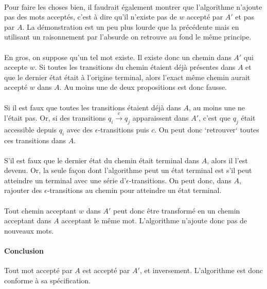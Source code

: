 \documentclass{article}[11pt]
\theoremstyle{definition}
\begin{document}
\paragraph*{}Pour faire les choses bien, il faudrait également montrer que l'algorithme n'ajoute pas des mots acceptés, c'est à dire qu'il n'existe pas de $w$ accepté par $A'$ et pas par $A$. La démonstration est un peu plus lourde que la précédente mais en utilisant un raisonnement par l'absurde on retrouve au fond le même principe.

\paragraph*{}En gros, on suppose qu'un tel mot existe. Il existe donc un chemin dans $A'$ qui accepte $w$. Si toutes les transitions du chemin étaient déjà présentes dans $A$ et que le dernier état était à l'origine terminal, alors l'exact même chemin aurait accepté $w$ dans $A$. Au moins une de deux propositions est donc fausse.

\paragraph*{}Si il est faux que toutes les transitions étaient déjà dans $A$, au moins une ne l'était pas. Or, si des transitions $q_i \xrightarrow{c} q_j$ apparaissent dans $A'$, c'est que $q_j$ était accessible depuis $q_i$ avec des $\epsilon$-transitions puis $c$. On peut donc `retrouver` toutes ces transitions dans $A$.

\paragraph*{}S'il est faux que le dernier état du chemin était terminal dans $A$, alors il l'est devenu. Or, la seule façon dont l'algorithme peut un état terminal est s'il peut atteindre un terminal avec une série d'$\epsilon$-transitions. On peut donc, dans $A$, rajouter des $\epsilon$-transitions au chemin pour atteindre un état terminal.

\paragraph*{}Tout chemin acceptant $w$ dans $A'$ peut donc être transformé en un chemin acceptant dans $A$ acceptant le même mot. L'algorithme n'ajoute donc pas de nouveaux mots.

\paragraph*{Conclusion} Tout mot accepté par $A$ est accepté par $A'$, et inversement. L'algorithme est donc conforme à sa spécification.
\end{document}
